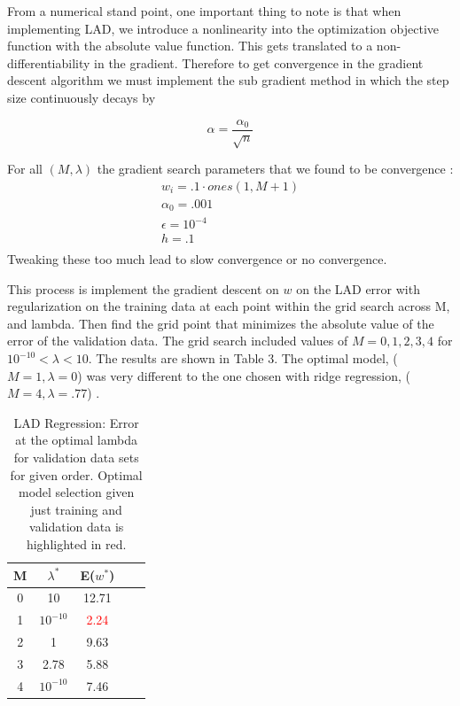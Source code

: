 \documentclass[10pt,twocolumn]{article}
\begin{document}
From a numerical stand point, one important thing to note is that when implementing LAD, we introduce a nonlinearity into the optimization objective function with the absolute value function. This gets translated to a non-differentiability in the gradient. Therefore to get convergence in the gradient descent algorithm we must implement the sub gradient method in which the step size continuously decays by 

\begin{equation}
\alpha= \frac{\alpha_0 }{\sqrt{n}}
\end{equation}

For all $(M, \lambda)$ the gradient search parameters  that we found to be  convergence : 
\begin{align}
w_i =.1 \cdot ones(1, M+1) \\
\alpha_0 = .001 \\
\epsilon = 10^{-4} \\
h = .1 \\ 
\end{align}
Tweaking these too much lead to slow convergence or no convergence. 

This process is implement the gradient descent on $w$ on the LAD error with regularization on the training data at each point within the grid search across M, and lambda. Then find the grid point that minimizes the absolute value of the error of the validation data. The grid search included values of $M= {0,1,2,3,4}$  for $10^{-10} < \lambda <10 $. The results are shown in  Table 3. The optimal model, ($M=1, \lambda = 0$) was very different to the one chosen with ridge regression, ($M=4, \lambda=.77$) .
\begin{table}
\begin{center}
  \begin{tabular}{ | c | c | c | c | c | }
    \hline
     M & $\lambda ^*$  & E($w^*$) \\ \hline
     0 & 10 & 12.71  \\ \hline
     1 & $ 10^{-10}$ & \textcolor{red}{2.24}   \\ \hline
     2 & 1 & 9.63   \\ \hline
     3 & 2.78 & 5.88   \\ \hline
     4 & $10^{-10}$ & 7.46   \\ \hline
    
    \hline
  \end{tabular}
  \caption{LAD Regression: Error at the optimal lambda for validation data sets for given order. Optimal model selection given just training and validation data is highlighted in red. }
\end{center}
\label{table:ave_sse}
\end{table}
\end{document}
